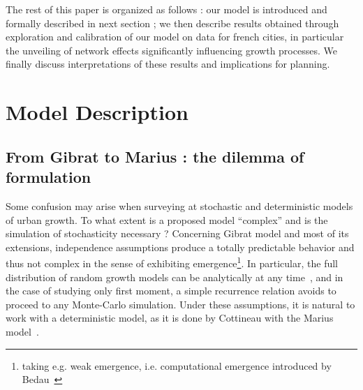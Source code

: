 \documentclass[Royal,sageh,times]{sagej}
\begin{document}
The rest of this paper is organized as follows : our model is introduced and formally described in next section ; we then describe results obtained through exploration and calibration of our model on data for french cities, in particular the unveiling of network effects significantly influencing growth processes. We finally discuss interpretations of these results and implications for planning.





\section*{Model Description}




\subsection*{From Gibrat to Marius : the dilemma of formulation}



Some confusion may arise when surveying at stochastic and deterministic models of urban growth. To what extent is a proposed model ``complex'' and is the simulation of stochasticity necessary ? Concerning Gibrat model and most of its extensions, independence assumptions produce a totally predictable behavior and thus not complex in the sense of exhibiting emergence\footnote{taking e.g. weak emergence, i.e. computational emergence introduced by Bedau~\cite{}}. In particular, the full distribution of random growth models can be analytically at any time~\cite{}, and in the case of studying only first moment, a simple recurrence relation avoids to proceed to any Monte-Carlo simulation. Under these assumptions, it is natural to work with a deterministic model, as it is done by Cottineau with the Marius model~\cite{}.





\end{document}
